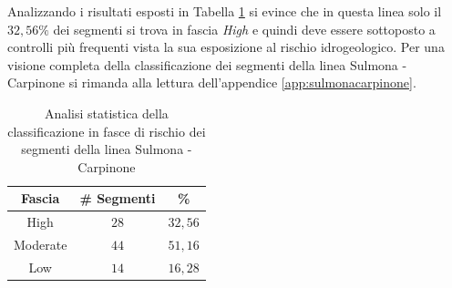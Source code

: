 \newline
Analizzando i risultati esposti in Tabella \ref{percentualesulmonacarpinone} si evince che in questa linea solo il $32,56\%$ dei segmenti si trova in fascia \textit{High} e quindi deve essere sottoposto a controlli più frequenti vista la sua esposizione al rischio idrogeologico. 
Per una visione completa della classificazione dei segmenti della linea Sulmona - Carpinone si rimanda alla lettura dell'appendice \ref{app:sulmonacarpinone}.
\begin{table}[h]
\centering
\begin{tabular}{|c|c|c|}
\hline \rowcolor{lightgray}
Fascia   & \# Segmenti & \%    \\ \hline \rowcolor{flamingopink}
High     & $28$           & $32,56$     \\ \hline \rowcolor{icterine}
Moderate & $44$          & $51,16$ \\ \hline \rowcolor{inchworm}
Low      & $14$          & $16,28$ \\ \hline
\end{tabular}
\caption{Analisi statistica della classificazione in fasce di rischio dei segmenti della linea Sulmona - Carpinone}
\label{percentualesulmonacarpinone}
\end{table}
\newpage
